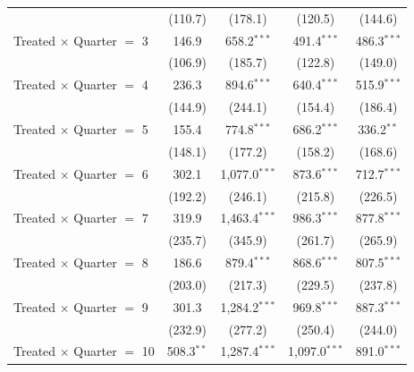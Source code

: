 \begin{longtable}{lcccc}
                                  & (110.7)                              & (178.1)         & (120.5)         & (144.6)         \\
  Treated $\times$ Quarter $=$ 3  & 146.9                                & 658.2$^{***}$   & 491.4$^{***}$   & 486.3$^{***}$   \\
                                  & (106.9)                              & (185.7)         & (122.8)         & (149.0)         \\
  Treated $\times$ Quarter $=$ 4  & 236.3                                & 894.6$^{***}$   & 640.4$^{***}$   & 515.9$^{***}$   \\
                                  & (144.9)                              & (244.1)         & (154.4)         & (186.4)         \\
  Treated $\times$ Quarter $=$ 5  & 155.4                                & 774.8$^{***}$   & 686.2$^{***}$   & 336.2$^{**}$    \\
                                  & (148.1)                              & (177.2)         & (158.2)         & (168.6)         \\
  Treated $\times$ Quarter $=$ 6  & 302.1                                & 1,077.0$^{***}$ & 873.6$^{***}$   & 712.7$^{***}$   \\
                                  & (192.2)                              & (246.1)         & (215.8)         & (226.5)         \\
  Treated $\times$ Quarter $=$ 7  & 319.9                                & 1,463.4$^{***}$ & 986.3$^{***}$   & 877.8$^{***}$   \\
                                  & (235.7)                              & (345.9)         & (261.7)         & (265.9)         \\
  Treated $\times$ Quarter $=$ 8  & 186.6                                & 879.4$^{***}$   & 868.6$^{***}$   & 807.5$^{***}$   \\
                                  & (203.0)                              & (217.3)         & (229.5)         & (237.8)         \\
  Treated $\times$ Quarter $=$ 9  & 301.3                                & 1,284.2$^{***}$ & 969.8$^{***}$   & 887.3$^{***}$   \\
                                  & (232.9)                              & (277.2)         & (250.4)         & (244.0)         \\
  Treated $\times$ Quarter $=$ 10 & 508.3$^{**}$                         & 1,287.4$^{***}$ & 1,097.0$^{***}$ & 891.0$^{***}$   \\

\end{longtable}
